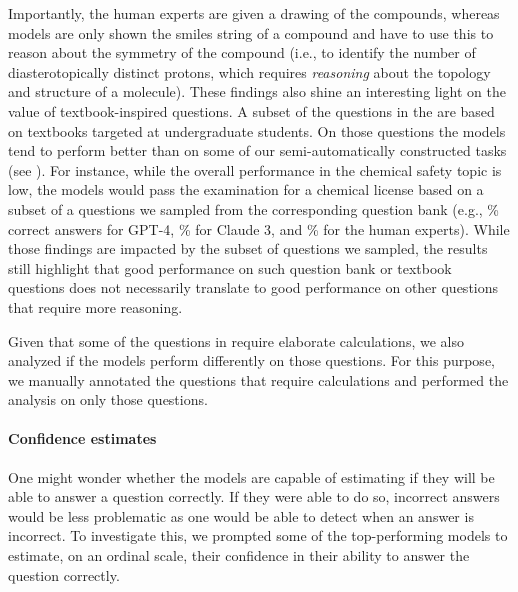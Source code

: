 \documentclass[11pt, oneside]{article}
\begin{document}
\begin{refsection}
Importantly, the human experts are given a drawing of the compounds, whereas models are only shown the \gls{smiles} string of a compound and have to use this to reason about the symmetry of the compound (i.e., to identify the number of diasterotopically distinct protons, which requires \emph{reasoning} about the topology and structure of a molecule). 
These findings also shine an interesting light on the value of textbook-inspired questions. 
A subset of the questions in the \chembench are based on textbooks targeted at undergraduate students. 
On those questions the models tend to perform better than on some of our semi-automatically constructed tasks (see ).
For instance, while the overall performance in the chemical safety topic is low, the models would pass the examination for a chemical license based on a subset of a questions we sampled from the corresponding question bank (e.g., \% correct answers for GPT-4, \% for Claude 3, and \% for the human experts).
While those findings are impacted by the subset of questions we sampled, the results still highlight that good performance on such question bank or textbook questions does not necessarily translate to good performance on other questions that require more reasoning.

Given that some of the questions in \chembench require elaborate calculations, we also analyzed if the models perform differently on those questions.
For this purpose, we manually annotated the questions that require calculations and performed the analysis on only those questions.  %

\clearpage

\paragraph{Confidence estimates} One might wonder whether the models are capable of estimating if they will be able to answer a question correctly. 
If they were able to do so, incorrect answers would be less problematic as one would be able to detect when an answer is incorrect.
To investigate this, we prompted\autocite{xiong2023llms} some of the top-performing models to estimate, on an ordinal scale, their confidence in their ability to answer the question correctly.


\end{refsection}
\end{document}
